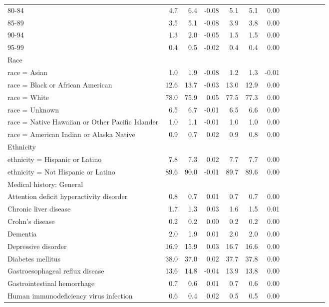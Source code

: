 \documentclass[11pt,]{article}
\begin{document}
\begin{longtable}{lrrrrrrrrrrrr}
      80-84 &  4.7 &  6.4 & -0.08 &  5.1 &  5.1 &  0.00 \\ 
      85-89 &  3.5 &  5.1 & -0.08 &  3.9 &  3.8 &  0.00 \\ 
      90-94 &  1.3 &  2.0 & -0.05 &  1.5 &  1.5 &  0.00 \\ 
      95-99 &  0.4 &  0.5 & -0.02 &  0.4 &  0.4 &  0.00 \\ 
  Race &    &    &     &    &    &     \\ 
      race = Asian &  1.0 &  1.9 & -0.08 &  1.2 &  1.3 & -0.01 \\ 
      race = Black or African American & 12.6 & 13.7 & -0.03 & 13.0 & 12.9 &  0.00 \\ 
      race = White & 78.0 & 75.9 &  0.05 & 77.5 & 77.3 &  0.00 \\ 
      race = Unknown &  6.5 &  6.7 & -0.01 &  6.5 &  6.6 &  0.00 \\ 
      race = Native Hawaiian or Other Pacific Islander &  1.0 &  1.1 & -0.01 &  1.0 &  1.0 &  0.00 \\ 
      race = American Indian or Alaska Native &  0.9 &  0.7 &  0.02 &  0.9 &  0.8 &  0.00 \\ 
  Ethnicity &    &    &     &    &    &     \\ 
      ethnicity = Hispanic or Latino &  7.8 &  7.3 &  0.02 &  7.7 &  7.7 &  0.00 \\ 
      ethnicity = Not Hispanic or Latino & 89.6 & 90.0 & -0.01 & 89.7 & 89.6 &  0.00 \\ 
  Medical history: General &    &    &     &    &    &     \\ 
      Attention deficit hyperactivity disorder &  0.8 &  0.7 &  0.01 &  0.7 &  0.7 &  0.00 \\ 
      Chronic liver disease &  1.7 &  1.3 &  0.03 &  1.6 &  1.5 &  0.01 \\ 
      Crohn's disease &  0.2 &  0.2 &  0.00 &  0.2 &  0.2 &  0.00 \\ 
      Dementia &  2.0 &  1.9 &  0.01 &  2.0 &  2.0 &  0.00 \\ 
      Depressive disorder & 16.9 & 15.9 &  0.03 & 16.7 & 16.6 &  0.00 \\ 
      Diabetes mellitus & 38.0 & 37.0 &  0.02 & 37.7 & 37.8 &  0.00 \\ 
      Gastroesophageal reflux disease & 13.6 & 14.8 & -0.04 & 13.9 & 13.8 &  0.00 \\ 
      Gastrointestinal hemorrhage &  0.7 &  0.6 &  0.01 &  0.7 &  0.6 &  0.00 \\ 
      Human immunodeficiency virus infection &  0.6 &  0.4 &  0.02 &  0.5 &  0.5 &  0.00 \\ 

\end{longtable}
\end{document}
